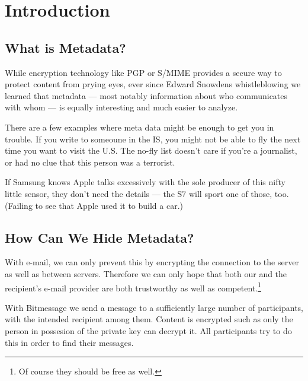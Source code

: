   \section{Introduction}

  \subsection{What is Metadata?}

  While encryption technology like PGP or S/MIME provides a secure way to protect content from prying eyes, ever since Edward Snowdens whistleblowing we learned that metadata --- most notably information about who communicates with whom --- is equally interesting and much easier to analyze.

  There are a few examples where meta data might be enough to get you in trouble. If you write to someoune in the IS, you might not be able to fly the next time you want to visit the U.S. The no-fly list doesn't care if you're a journalist, or had no clue that this person was a terrorist.

  If Samsung knows Apple talks excessively with the sole producer of this nifty little sensor, they don't need the details --- the S7 will sport one of those, too. (Failing to see that Apple used it to build a car.)

  \subsection{How Can We Hide Metadata?}

  With e-mail, we can only prevent this by encrypting the connection to the server as well as between servers. Therefore we can only hope that both our and the recipient's e-mail provider are both trustworthy as well as competent.\footnote{Of course they should be free as well.}

  With Bitmessage we send a message to a sufficiently large number of participants, with the intended recipient among them. Content is encrypted such as only the person in possesion of the private key can decrypt it. All participants try to do this in order to find their messages.
